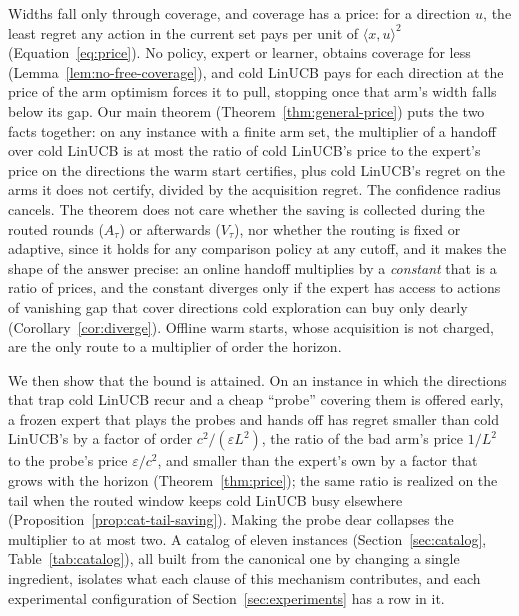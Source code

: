 \documentclass{article}
\theoremstyle{definition}
\theoremstyle{remark}
\newcommand{\eps}{\varepsilon}
\theoremstyle{remark}
\begin{document}
Widths fall only through coverage, and coverage has a price: for a direction
$u$, the least regret any action in the current set pays per unit of
$\langle x,u\rangle^2$ (Equation~\eqref{eq:price}). No policy, expert or
learner, obtains coverage for less (Lemma~\ref{lem:no-free-coverage}), and
cold LinUCB pays for each direction at the price of the arm optimism forces it
to pull, stopping once that arm's width falls below its gap. Our main theorem
(Theorem~\ref{thm:general-price}) puts the two facts together: on any
instance with a finite arm set, the multiplier of a handoff over cold LinUCB
is at most the ratio of cold LinUCB's price to the expert's price on the
directions the warm start certifies, plus cold LinUCB's regret on the arms
it does not certify, divided by the acquisition regret. The confidence radius
cancels. The theorem does not care whether the saving is collected during
the routed rounds ($A_\tau$) or afterwards ($V_\tau$), nor whether the
routing is fixed or adaptive, since it holds for any comparison policy at
any cutoff, and it makes the shape of the answer precise: an online handoff multiplies by a
\emph{constant} that is a ratio of prices, and the constant diverges only
if the expert has access to actions of vanishing gap that cover directions
cold exploration can buy only dearly (Corollary~\ref{cor:diverge}). Offline
warm starts, whose acquisition is not charged, are the only route to a
multiplier of order the horizon.

We then show that the bound is attained. On an instance in which the
directions that trap cold LinUCB recur and a cheap ``probe'' covering them is
offered early, a frozen expert that plays the probes and hands off has regret
smaller than cold LinUCB's by a factor of order $c^2/(\eps L^2)$, the ratio of
the bad arm's price $1/L^2$ to the probe's price $\eps/c^2$, and smaller than
the expert's own by a factor that grows with the horizon
(Theorem~\ref{thm:price}); the same ratio is realized on the tail when the
routed window keeps cold LinUCB busy elsewhere
(Proposition~\ref{prop:cat-tail-saving}). Making the probe dear collapses the
multiplier to at most two. A catalog of eleven instances
(Section~\ref{sec:catalog}, Table~\ref{tab:catalog}), all built from the
canonical one by changing a single ingredient, isolates what each clause of
this mechanism contributes, and each experimental configuration of
Section~\ref{sec:experiments} has a row in it.
\end{document}

